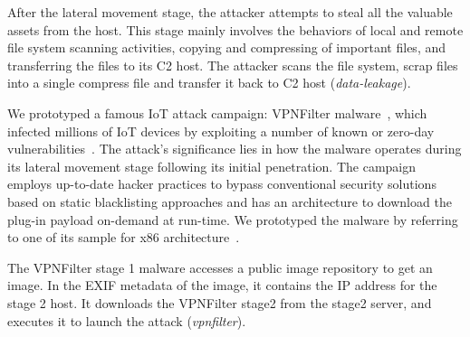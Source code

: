 After the lateral movement stage, the attacker attempts to steal all the valuable assets from the host. 
This stage mainly involves the behaviors of local and remote file system scanning activities, copying and compressing of important files, and transferring the files to its C2 host.
The attacker scans the file system, scrap files into a single compress file and transfer it back to C2 host (\emph{data-leakage}).


We prototyped a famous IoT attack campaign: VPNFilter malware~\cite{vpnfilterschenier}, which infected millions of IoT devices by exploiting a number of known or zero-day vulnerabilities~\cite{vpnfilter1,vpnfilter2}. 
The attack's significance lies in how the malware operates during its lateral movement stage following its initial penetration. 
The campaign employs up-to-date hacker practices to bypass conventional security solutions based on static blacklisting approaches and has an architecture to download the plug-in payload on-demand at run-time. 
We prototyped the malware by referring to one of its sample for x86 architecture~\cite{vpnfilterx86}.

The VPNFilter stage 1 malware accesses a public image repository to get an image. In the EXIF metadata of the image, it contains the IP address for the stage 2 host. It downloads the VPNFilter stage2 from the stage2 server, and executes it to launch the attack (\emph{vpnfilter}).


